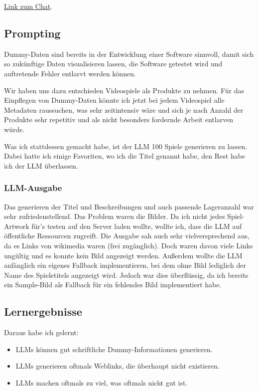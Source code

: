 \documentclass[12pt, a4paper]{scrreprt}
\begin{document}
	\href{https://gemini.google.com/share/154e58452bd1}{Link zum Chat}.

	\subsection{Prompting}

	Dummy-Daten sind bereits in der Entwicklung einer Software sinnvoll, damit sich so zukünftige Daten visualisieren lassen, die Software getestet wird und auftretende Fehler entlarvt werden können.

	Wir haben uns dazu entschieden Videospiele als Produkte zu nehmen. Für das Einpflegen von Dummy-Daten könnte ich jetzt bei jedem Videospiel alle Metadaten raussuchen, was sehr zeitintensiv wäre und sich je nach Anzahl der Produkte sehr repetitiv und als nicht besonders fordernde Arbeit entlarven würde.

	Was ich stattdessen gemacht habe, ist der LLM 100 Spiele generieren zu lassen. Dabei hatte ich einige Favoriten, wo ich die Titel genannt habe, den Rest habe ich der LLM überlassen.

	\subsubsection{LLM-Ausgabe}

	Das generieren der Titel und Beschreibungen und auch passende Lageranzahl war sehr zufriedenstellend. Das Problem waren die Bilder. Da ich nicht jedes Spiel-Artwork für's testen auf den Server laden wollte, wollte ich, dass die LLM auf öffentliche Ressourcen zugreift. Die Ausgabe sah auch sehr vielversprechend aus, da es Links von wikimedia waren (frei zugänglich). Doch waren davon viele Links ungültig und es konnte kein Bild angezeigt werden. Außerdem wollte die LLM anfänglich ein eigenes Fallback implementieren, bei dem ohne Bild lediglich der Name des Spieletitels angezeigt wird. Jedoch war dies überflüssig, da ich bereits ein Sample-Bild als Fallback für ein fehlendes Bild implementiert habe.

	\subsection{Lernergebnisse}

	Daraus habe ich gelernt:

	\begin{itemize}
		\item 	LLMs können gut schriftliche Dummy-Informationen generieren.
		\item 	LLMs generieren oftmals Weblinks, die überhaupt nicht existieren.
		\item   LLMs machen oftmals zu viel, was oftmals nicht gut ist.
	\end{itemize}
\end{document}
